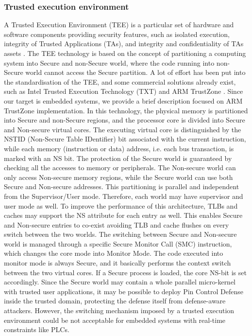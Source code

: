 \subsubsection{Trusted execution environment}

A Trusted Execution Environment (TEE) is a particular set of hardware and software components providing security features,
such as isolated execution, integrity of Trusted Applications (TAs), and integrity and confidentiality of TAs assets \cite{tee}.
The TEE technology is based on the concept of partitioning a computing system into Secure and non-Secure world, where
the code running into non-Secure world cannot access the Secure partition.
A lot of effort has been put into the standardisation of the TEE, and some commercial solutions already exist,
such as Intel Trusted Execution Technology (TXT) \cite{intel_txt} and ARM TrustZone \cite{trustzone}.
Since our target is embedded systems, we provide a brief description focused on ARM TrustZone implementation.
In this technology, the physical memory is partitioned into Secure and non-Secure regions, and the processor core is divided into Secure and Non-secure virtual cores.
The executing virtual core is distinguished by the NSTID (Non-Secure Table IDentifier) bit associated with the current instruction,
while each memory (instruction or data) address, i.e. each bus transaction, is marked with an NS bit.
The protection of the Secure world is guaranteed by checking all the accesses to memory or peripherals.
The Non-secure world can only access Non-secure memory regions, while the Secure world can use both Secure and Non-secure addresses.
This partitioning is parallel and independent from the Supervisor/User mode. Therefore, each world may have supervisor and user mode as well.
To improve the performance of this architecture, TLBs and caches may support the NS attribute for each entry as well.
This enables Secure and Non-secure entries to co-exist avoiding TLB and cache flushes on every switch between the two worlds.
The switching between Secure and Non-secure world is managed through a specific Secure Monitor Call (SMC) instruction,
which changes the core mode into Monitor Mode. The code executed into monitor mode is always Secure, and it basically performs the context switch
between the two virtual cores. If a Secure process is loaded, the core NS-bit is set accordingly.
Since the Secure world may contain a whole parallel micro-kernel with trusted user applications, it may be possible
to deploy Pin Control Defense inside the trusted domain, protecting the defense itself from defense-aware attackers.
However, the switching mechanism imposed by a trusted execution environment could be not acceptable for embedded systems with real-time constraints like PLCs.


